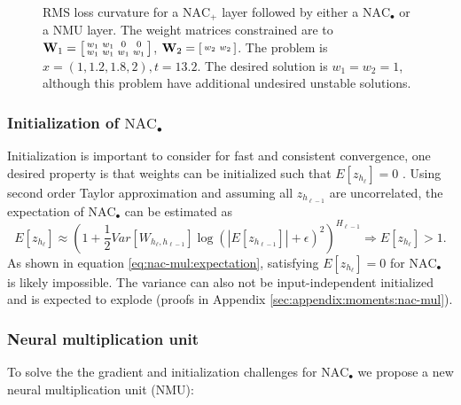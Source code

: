 \begin{figure}[h]
\caption{RMS loss curvature for a $\mathrm{NAC}_{+}$ layer followed by either a $\mathrm{NAC}_{\bullet}$ or a NMU layer. The weight matrices constrained are to $\mathbf{W}_1 = \left[\protect\begin{smallmatrix}
w_1 & w_1 & 0 & 0 \\
w_1 & w_1 & w_1 & w_1
\protect\end{smallmatrix}\right]$, $\mathbf{W}_2 = \left[\protect\begin{smallmatrix}
w_2 & w_2
\protect\end{smallmatrix}\right]$. The problem is $x = \left(1, 1.2, 1.8, 2\right), t = 13.2$. The desired solution is $w_1 = w_2 = 1$, although this problem have additional undesired unstable solutions.}
\label{fig:nac-mul-eps-issue}
\end{figure}

\subsubsection{Initialization of $\mathrm{NAC}_{\bullet}$}
Initialization is important to consider for fast and consistent convergence, one desired property is that weights can be initialized such that $E[z_{h_\ell}] = 0$ \cite{glorot-initialization}. Using second order Taylor approximation and assuming all $z_{h_{\ell-1}}$ are uncorrelated, the expectation of $\mathrm{NAC}_{\bullet}$ can be estimated as
\begin{equation}
E[z_{h_\ell}] \approx \left(1 + \frac{1}{2} Var[W_{h_\ell, h_{\ell-1}}] \log(|E[z_{h_{\ell-1}}]| + \epsilon)^2\right)^{H_{\ell-1}} \Rightarrow E[z_{h_\ell}] > 1.
\label{eq:nac-mul:expectation}
\end{equation}
As shown in equation \ref{eq:nac-mul:expectation}, satisfying $E[z_{h_\ell}] = 0$ for $\mathrm{NAC}_{\bullet}$ is likely impossible. The variance can also not be input-independent initialized and is expected to explode (proofs in Appendix \ref{sec:appendix:moments:nac-mul}).

\subsubsection{Neural multiplication unit}
To solve the the gradient and initialization challenges for $\mathrm{NAC}_{\bullet}$ we propose a new neural multiplication unit (NMU):

